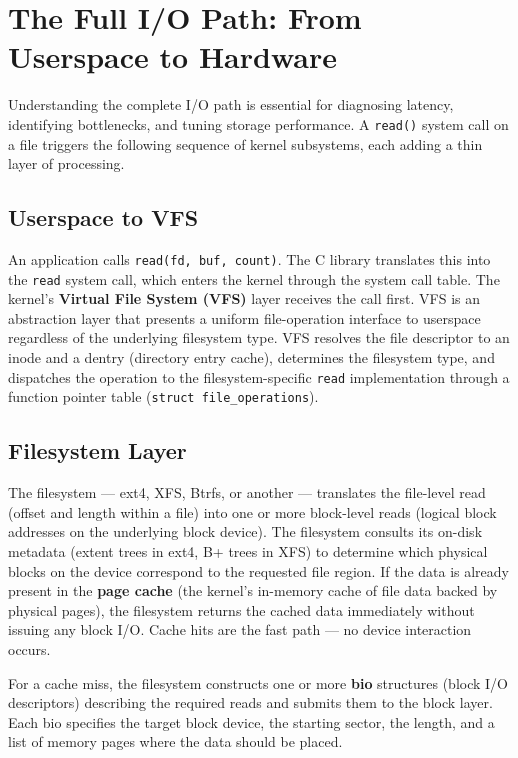 \section{The Full I/O Path: From Userspace to Hardware}
\label{sec:io-path}

Understanding the complete I/O path is essential for diagnosing latency, identifying bottlenecks, and tuning storage performance. A \texttt{read()} system call on a file triggers the following sequence of kernel subsystems, each adding a thin layer of processing.

\subsection{Userspace to VFS}

An application calls \texttt{read(fd, buf, count)}. The C library translates this into the \texttt{read} system call, which enters the kernel through the system call table. The kernel's \textbf{Virtual File System (VFS)} layer receives the call first. VFS is an abstraction layer that presents a uniform file-operation interface to userspace regardless of the underlying filesystem type. VFS resolves the file descriptor to an inode and a dentry (directory entry cache), determines the filesystem type, and dispatches the operation to the filesystem-specific \texttt{read} implementation through a function pointer table (\texttt{struct file\_operations}).

\subsection{Filesystem Layer}

The filesystem --- ext4, XFS, Btrfs, or another --- translates the file-level read (offset and length within a file) into one or more block-level reads (logical block addresses on the underlying block device). The filesystem consults its on-disk metadata (extent trees in ext4, B+ trees in XFS) to determine which physical blocks on the device correspond to the requested file region. If the data is already present in the \textbf{page cache} (the kernel's in-memory cache of file data backed by physical pages), the filesystem returns the cached data immediately without issuing any block I/O. Cache hits are the fast path --- no device interaction occurs.

For a cache miss, the filesystem constructs one or more \textbf{bio} structures (block I/O descriptors) describing the required reads and submits them to the block layer. Each bio specifies the target block device, the starting sector, the length, and a list of memory pages where the data should be placed.

